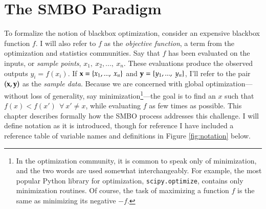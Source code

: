 \chapter{The SMBO Paradigm}\label{ch:smbo}

To formalize the notion of blackbox optimization, consider an expensive blackbox function $f$. I will also refer to $f$ as the \emph{objective function}, a term from the optimization and statistics communities. Say that $f$ has been evaluated on the inputs, or \emph{sample points}, $x_1,\ x_2, ... ,\ x_n$. These evaluations produce the observed outputs $y_i=f(x_i)$. If $\mathbf{x}=\{x_1, ... ,\ x_n\}$ and $\mathbf{y}=\{y_1, ...,\ y_n\}$, I'll refer to the pair $(\mathbf{x},\mathbf{y})$ as the \emph{sample data}. Because we are concerned with global optimization---without loss of generality, say minimization\footnote{In the optimization community, it is common to speak only of minimization, and the two words are used somewhat interchangeably. For example, the most popular Python library for optimization, \texttt{scipy.optimize}, contains only minimization routines. Of course, the task of maximizing a function $f$ is the same as minimizing its negative $-f$. }---the goal is to find an $x$ such that $f(x)<f(x')\ \ \forall\ x' \ne x$, while evaluating $f$ as few times as possible. This chapter describes formally how the SMBO process addresses this challenge. I will define notation as it is introduced, though for reference I have included a reference table of variable names and definitions in Figure \ref{fig:notation} below.

